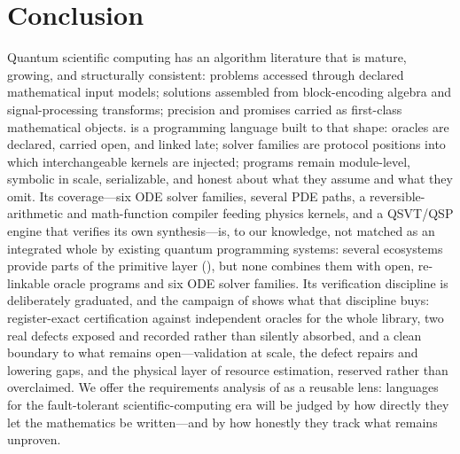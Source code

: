\section{Conclusion}
\label{sec:conclusion}

Quantum scientific computing has an algorithm literature that is mature,
growing, and structurally consistent: problems accessed through declared
mathematical input models; solutions assembled from block-encoding algebra
and signal-processing transforms; precision and promises carried as
first-class mathematical objects.  \pqlang{} is a programming language built
to that shape: oracles are declared, carried open, and linked late; solver
families are protocol positions into which interchangeable kernels are
injected; programs remain module-level, symbolic in scale, serializable,
and honest about what they assume and what they omit.  Its coverage---six
ODE solver families, several PDE paths, a reversible-arithmetic and
math-function compiler feeding physics kernels, and a QSVT/QSP engine that
verifies its own synthesis---is, to our knowledge, not matched as an
integrated whole by existing quantum programming systems: several
ecosystems provide parts of the primitive layer (),
but none combines them with open, re-linkable oracle programs and six
ODE solver families.  Its verification discipline is deliberately
graduated, and the campaign of  shows what that
discipline buys: register-exact certification against independent oracles
for the whole library, two real defects exposed and recorded rather than
silently absorbed, and a clean boundary to what remains open---validation
at scale, the defect repairs and lowering gaps, and the physical layer of
resource estimation, reserved rather than overclaimed.  We offer
the requirements analysis of  as a reusable lens:
languages for the fault-tolerant scientific-computing era will be judged by
how directly they let the mathematics be written---and by how honestly they
track what remains unproven.
